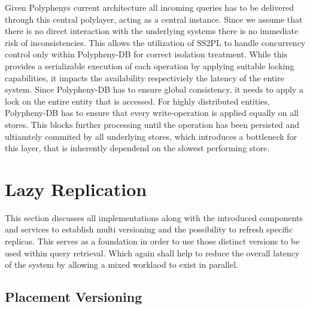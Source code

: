 Given Polyphenys current architecture all incoming queries has to be delivered through this central polylayer, acting as a central instance.
Since we assume that there is no direct interaction with the underlying systems there is no immediate risk of inconsistencies. 
This allows the utilization of SS2PL to handle concurrency control only within Polypheny-DB for correct isolation treatment.
While this provides a serializable execution of each operation by applying suitable locking capabilities, it impacts the availability respectiviely the latency of the entire system.
Since Polypheny-DB has to ensure global consistency, it needs to apply a lock on the entire entity that is accessed. 
For highly distributed entities, Polypheny-DB has to ensure that every write-operation is applied equally on all stores.
This blocks further processing until the operation has been persisted and ultiamtely commited by all underlying stores,
which introduces a bottleneck for this layer, that is inherently dependend on the slowest performing store.








\section{Lazy Replication}
\label{sec:lazy_replication}

This section discusses all implementations along with the introduced components and services to establish 
multi versioning and the possibility to refresh specific replicas. This serves as a foundation in order to use those distinct versions
to be used within query retrieval. Which again shall help to reduce the overall latency of the system by allowing a mixed worklaod to exist in parallel.



\subsection{Placement Versioning}

